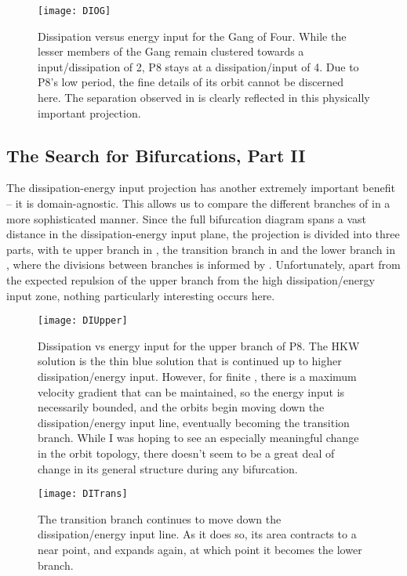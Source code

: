 \begin{figure}[h]
\texttt{[image: DIOG]}
\caption{Dissipation versus energy input for the Gang of Four. While the lesser members of the Gang remain clustered towards a input/dissipation of 2, P8 stays at a dissipation/input of 4. Due to P8's low period, the fine details of its orbit cannot be discerned here. The separation observed in  is clearly reflected in this physically important projection.}\label{fig:DIGOF}
\end{figure}

\subsection{The Search for Bifurcations, Part II}
The dissipation-energy input projection has another extremely important benefit -- it is domain-agnostic. This allows us to compare the different branches of  in a more sophisticated manner. Since the full bifurcation diagram spans a vast distance in the dissipation-energy input plane, the projection is divided into three parts, with te upper branch in , the transition branch in  and the lower branch in , where the divisions between branches is informed by . Unfortunately, apart from the expected repulsion of the upper branch from the high dissipation/energy input zone, nothing particularly interesting occurs here.\\


\begin{figure}[h]
\texttt{[image: DIUpper]}
\caption{Dissipation vs energy input for the upper branch of P8. The HKW solution is the thin blue solution that is continued up to higher dissipation/energy input. However, for finite \ReN, there is a maximum velocity gradient that can be maintained, so the energy input is necessarily bounded, and the orbits begin moving down the dissipation/energy input line, eventually becoming the transition branch. While I was hoping to see an especially meaningful change in the orbit topology, there doesn't seem to be a great deal of change in its general structure during any bifurcation. }\label{fig:DIUpper}
\end{figure}

\begin{figure}[h]
\texttt{[image: DITrans]}
\caption{The transition branch continues to move down the dissipation/energy input line. As it does so, its area contracts to a near point, and expands again, at which point it becomes the lower branch. }\label{fig:DITrans}
\end{figure}

